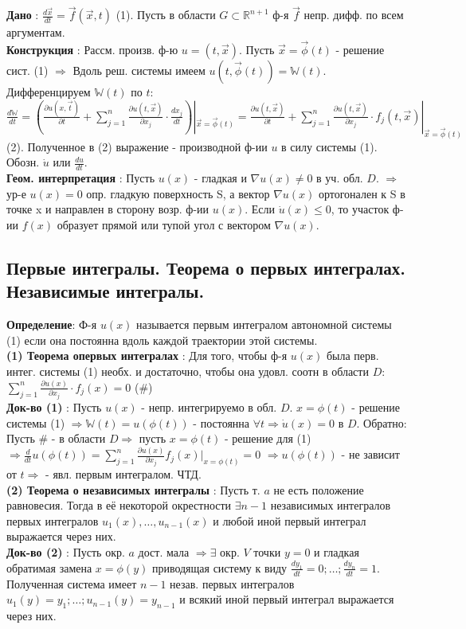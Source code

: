 \documentclass[unicode, 8pt, a4paper,oneside, landscape]{article}
\begin{document}
\begin{multicols}{4}
{\bf Дано} : $\frac{d\vec{x}}{dt} = \vec{f}(\vec{x}, t)$ (1). Пусть в области $G \subset \mathbb{R}^{n+1}$ ф-я $\vec{f}$ непр. дифф. по всем аргументам.\\
{\bf Конструкция} : Рассм. произв. ф-ю $u = (t, \vec{x})$. Пусть $\vec{x} = \vec{\phi}(t)$ - решение сист. (1) $\Rightarrow$ Вдоль реш. системы имеем $u(t, \vec{\phi}(t)) = \mathbb{W}(t)$. Дифференцируем $\mathbb{W}(t)$ по $t$: $\frac{d\mathbb{W}}{dt} = (\frac{\partial u(x, \vec{t})}{\partial t} + \sum_{j=1}^n\frac{\partial u(t, \vec{x})}{\partial x_j} \cdot \frac{dx_j}{dt})|_{\vec{x} = \vec{\phi}(t)} = \frac{\partial u(t, \vec{x})}{\partial t} + \sum_{j=1}^n \frac{\partial u(t, \vec{x})}{\partial x_j} \cdot f_j(t, \vec{x})|_{\vec{x} = \vec{\phi}(t)}$ (2). Полученное в (2) выражение - производной ф-ии $u$ в силу системы (1). Обозн. $\dot{u}$ или $\frac{du}{dt}$.\\
{\bf Геом. интерпретация} : Пусть $u(x)$ - гладкая и $\nabla u(x) \neq 0$ в уч. обл. $D$. $\Rightarrow$ ур-е $u(x) = 0$ опр. гладкую поверхность S, а вектор $\nabla u(x)$ ортогонален к S в точке x и направлен в сторону возр. ф-ии $u(x)$. Если $\dot{u}(x) \leq 0$, то участок ф-ии $f(x)$ образует прямой или тупой угол с вектором $\nabla u(x)$.

\subsection{Первые интегралы. Теорема о первых интегралах. Независимые интегралы.}
{\bf Определение}: Ф-я $u(x)$ называется первым интегралом автономной системы (1) если она постоянна вдоль каждой траектории этой системы.\\
{\bf (1) Теорема опервых интегралах} : Для того, чтобы ф-я $u(x)$ была перв. интег. системы (1) необх. и достаточно, чтобы она удовл. соотн в области $D$: $\sum_{j=1}^n \frac{\partial u(x)}{\partial x_j}\cdot f_j(x) = 0$ (\#)\\
{\bf Док-во (1)} : Пусть $u(x)$ - непр. интегрируемо в обл. $D$. $x = \phi(t)$ - решение системы (1) $\Rightarrow \mathbb{W}(t) = u(\phi(t))$ - постоянна $\forall t \Rightarrow \dot{u}(x) = 0$ в $D$. Обратно: Пусть \# - в области $D \Rightarrow$ пусть $x = \phi(t)$ - решение для (1) $\Rightarrow \frac{d}{dt}u(\phi(t)) = \sum_{j=1}^n \frac{\partial u(x)}{\partial x_j}f_j(x)|_{x = \phi(t)} = 0$ $\Rightarrow u(\phi(t))$ - не зависит от $t \Rightarrow$ - явл. первым интегралом. ЧТД.\\
{\bf (2) Теорема о независимых интегралы} : Пусть т. $a$ не есть положение равновесия. Тогда в её некоторой окрестности $\exists n-1$ независимых интегралов первых интегралов $u_1(x), \ldots, u_{n-1}(x)$ и любой иной первый интеграл выражается через них.\\
{\bf Док-во (2)} : Пусть окр. $a$ дост. мала $\Rightarrow \exists$ окр. $V$ точки $y=0$ и гладкая обратимая замена $x = \phi(y)$ приводящая систему к виду $\frac{dy_1}{dt} = 0; \ldots; \frac{dy_n}{dt} = 1$. Полученная система имеет $n-1$ незав. первых интегралов $u_1(y) = y_1; \ldots; u_{n-1}(y) = y_{n-1}$ и всякий иной первый интеграл выражается через них. 


\end{multicols}
\end{document}
